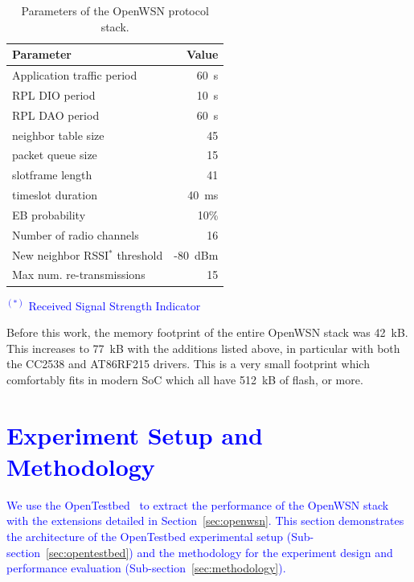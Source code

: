 \documentclass[sensors,article,submit,moreauthors,pdftex]{Definitions/mdpi}
\newcommand{\update}[1]     {\textcolor{blue}{#1}}
\begin{document}
\begin{table}[ht]
\centering
    \caption{Parameters of the OpenWSN protocol stack.}
    \begin{tabular}{|l|r|}
        \hline
        Parameter                           &   Value \\ \hline
        Application traffic period          &    60~s \\
        RPL DIO period                      &    10~s \\
        RPL DAO period                      &    60~s \\
        neighbor table size                 &      45 \\
        packet queue size                   &      15 \\
        slotframe length                    &      41 \\
        timeslot duration                   &   40~ms \\
        EB probability                      &    10\% \\
        Number of radio channels            &      16 \\
        New neighbor RSSI$^{*}$ threshold         & -80~dBm \\
        Max num. re-transmissions           &      15 \\ \hline
    \end{tabular}
    \label{tab:stack_params}
    
    \update{
    \footnotesize {$^{(*)}$ Received Signal Strength Indicator}
    }
\end{table}



Before this work, the memory footprint of the entire OpenWSN stack was 42~kB.
This increases to 77~kB with the additions listed above, in particular with both the CC2538 and AT86RF215 drivers.
This is a very small footprint which comfortably fits in modern SoC which all have 512~kB of flash, or more.


\section{\update{Experiment Setup and Methodology}}
\label{sec:setup}
\update{
We use the OpenTestbed~\cite{munoz19opentestbed} to extract the performance of the OpenWSN stack with the extensions detailed in Section~\ref{sec:openwsn}.
This section demonstrates
    the architecture of the OpenTestbed experimental setup
        (Sub-section~\ref{sec:opentestbed}) and
    the methodology for the experiment design and performance evaluation
        (Sub-section~\ref{sec:methodology}).
}        
\end{document}
